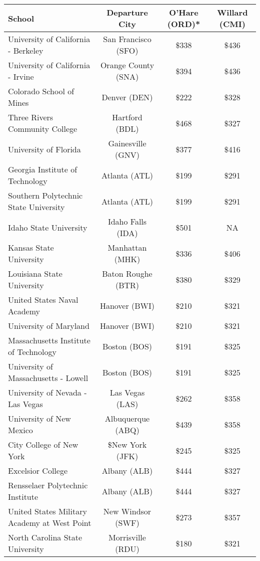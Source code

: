 \begin{center}
   \begin{tabular}{lccc}
   	\hline\hline
    \textbf{School} & \textbf{Departure City} & \textbf{O'Hare (ORD)*} & \textbf{Willard (CMI)} \\
    \hline\hline
    University of California - Berkeley & San Francisco (SFO) & $\$$338 & $\$$436 \\
    University of California - Irvine&Orange County (SNA)&$\$$394&$\$$436\\
    Colorado School of Mines & Denver (DEN) & $\$$222 & $\$$328 \\
    Three Rivers Community College & Hartford (BDL) & $\$$468 & $\$$327 \\ 
    University of Florida & Gainesville (GNV)& $\$$377 & $\$$416 \\
    Georgia Institute of Technology & Atlanta (ATL)& $\$$199 & $\$$291 \\
    Southern Polytechnic State University & Atlanta (ATL) & $\$$199 & $\$$291 \\
    Idaho State University & Idaho Falls (IDA) & $\$$501 & NA \\
    Kansas State University & Manhattan (MHK) & $\$$336 & $\$$406 \\ 
    Louisiana State University & Baton Roughe (BTR) & $\$$380 & $\$$329 \\
    United States Naval Academy & Hanover (BWI) & $\$$210 & $\$$321 \\  
    University of Maryland & Hanover (BWI)&$\$$210 &$\$$321 \\ 
    Massachusetts Institute of Technology & Boston (BOS)&$\$$191 &$\$$325 \\ 
    University of Massachusetts - Lowell &Boston (BOS) &$\$$191 &$\$$325 \\
    University of Nevada - Las Vegas & Las Vegas (LAS)& $\$$262 &$\$$358 \\ 
    University of New Mexico &Albuquerque (ABQ) &$\$$439 &$\$$358 \\ 
    City College of New York &$\$$New York (JFK) &$\$$245 &$\$$325 \\
    Excelsior College & Albany (ALB) &$\$$444 &$\$$327 \\ 
    Rensselaer Polytechnic Institute & Albany (ALB)&$\$$444 &$\$$327 \\ 
    United States Military Academy at West Point&New Windsor (SWF)&$\$$273 &$\$$357 \\ 
    North Carolina State University &Morrisville (RDU) &$\$$180 &$\$$321 \\

\end{tabular}
\end{center}
